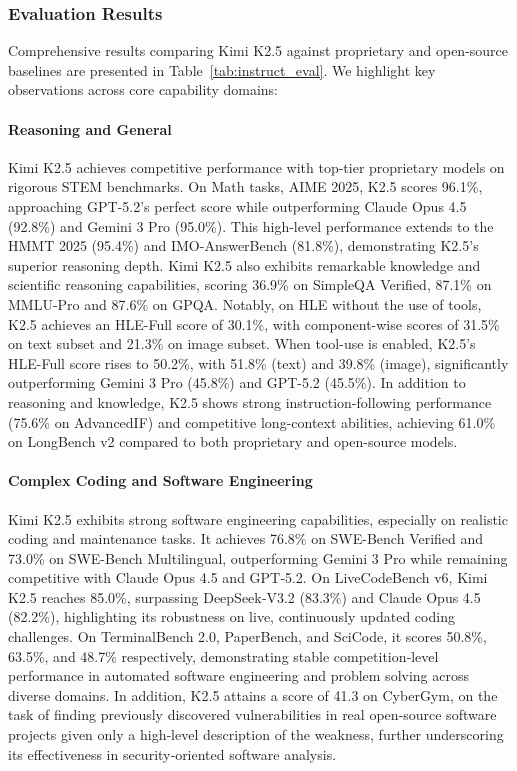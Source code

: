 \subsubsection{Evaluation Results}
\label{sec:eval_results}
Comprehensive results comparing Kimi K2.5 against proprietary and open-source baselines are presented in Table~\ref{tab:instruct_eval}. We highlight key observations across core capability domains:
\paragraph{Reasoning and General}
Kimi K2.5 achieves competitive performance with top-tier proprietary models on rigorous STEM benchmarks. On Math tasks, AIME 2025, K2.5 scores 96.1\%, approaching GPT-5.2's perfect score while outperforming Claude Opus 4.5 (92.8\%) and Gemini 3 Pro (95.0\%). This high-level performance extends to the HMMT 2025 (95.4\%) and IMO-AnswerBench (81.8\%), demonstrating K2.5's superior reasoning depth. Kimi K2.5 also exhibits remarkable knowledge and scientific reasoning capabilities, scoring 36.9\% on SimpleQA Verified, 87.1\% on MMLU-Pro and 87.6\% on GPQA. Notably, on HLE without the use of tools, K2.5 achieves an HLE-Full score of 30.1\%, with component-wise scores of 31.5\% on text subset and 21.3\% on image subset. When tool-use is enabled, K2.5’s HLE-Full score rises to 50.2\%, with 51.8\% (text) and 39.8\% (image), significantly outperforming Gemini 3 Pro (45.8\%) and GPT-5.2 (45.5\%). In addition to reasoning and knowledge, K2.5 shows strong instruction-following performance (75.6\% on AdvancedIF) and competitive long-context abilities, achieving 61.0\% on LongBench v2 compared to both proprietary and open-source models.

\paragraph{Complex Coding and Software Engineering}
Kimi K2.5 exhibits strong software engineering capabilities, especially on realistic coding and maintenance tasks. It achieves 76.8\% on SWE-Bench Verified and 73.0\% on SWE-Bench Multilingual, outperforming Gemini 3 Pro while remaining competitive with Claude Opus 4.5 and GPT‑5.2. On LiveCodeBench v6, Kimi K2.5 reaches 85.0\%, surpassing DeepSeek‑V3.2 (83.3\%) and Claude Opus 4.5 (82.2\%), highlighting its robustness on live, continuously updated coding challenges. On TerminalBench 2.0, PaperBench, and SciCode, it scores 50.8\%, 63.5\%, and 48.7\% respectively, demonstrating stable competition‑level performance in automated software engineering and problem solving across diverse domains. In addition, K2.5 attains a score of 41.3 on CyberGym, on the task of finding previously discovered vulnerabilities in real open‑source software projects given only a high‑level description of the weakness, further underscoring its effectiveness in security‑oriented software analysis.

